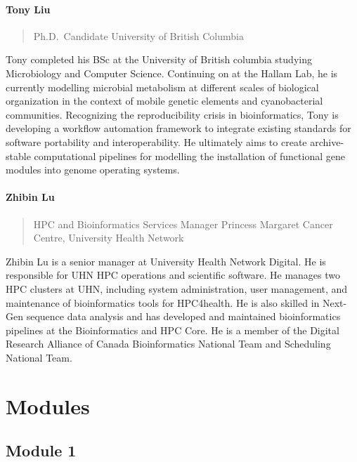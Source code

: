 \documentclass[
]{book}
\begin{document}
\subsection{Tony Liu}\label{tony-liu}

\begin{quote}
Ph.D.~Candidate
University of British Columbia
\end{quote}

Tony completed his BSc at the University of British columbia studying Microbiology and Computer Science. Continuing on at the Hallam Lab, he is currently modelling microbial metabolism at different scales of biological organization in the context of mobile genetic elements and cyanobacterial communities. Recognizing the reproducibility crisis in bioinformatics, Tony is developing a workflow automation framework to integrate existing standards for software portability and interoperability. He ultimately aims to create archive-stable computational pipelines for modelling the installation of functional gene modules into genome operating systems.

\subsection{Zhibin Lu}\label{zhibin-lu}

\begin{quote}
HPC and Bioinformatics Services Manager
Princess Margaret Cancer Centre, University Health Network
\end{quote}

Zhibin Lu is a senior manager at University Health Network Digital. He is responsible for UHN
HPC operations and scientific software. He manages two HPC clusters at UHN, including
system administration, user management, and maintenance of bioinformatics tools for
HPC4health. He is also skilled in Next-Gen sequence data analysis and has developed and
maintained bioinformatics pipelines at the Bioinformatics and HPC Core. He is a member of the
Digital Research Alliance of Canada Bioinformatics National Team and Scheduling National
Team.

\part{Modules}\label{part-modules}

\chapter{Module 1}\label{module-1}
\end{document}
